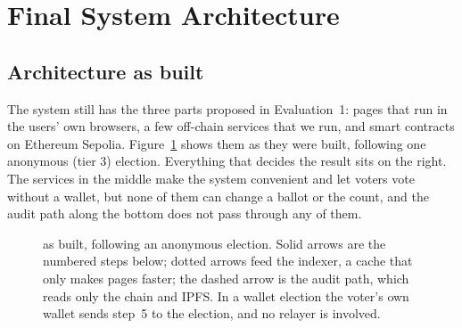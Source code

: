 \section{Final System Architecture}\label{sec:architecture}

\subsection{Architecture as built}

The system still has the three parts proposed in Evaluation~1: pages that run
in the users' own browsers, a few off-chain services that we run, and smart
contracts on Ethereum Sepolia. Figure~\ref{fig:final-architecture} shows them as
they were built, following one anonymous (tier 3) election. Everything that
decides the result sits on the right. The services in the middle make the
system convenient and let voters vote without a wallet, but none of them can
change a ballot or the count, and the audit path along the bottom does not
pass through any of them.

\begin{figure}[htbp]
  \centering
  \resizebox{\textwidth}{!}{}
  \caption{\projectname{} as built, following an anonymous election. Solid
    arrows are the numbered steps below; dotted arrows feed the indexer, a
    cache that only makes pages faster; the dashed arrow is the audit path,
    which reads only the chain and IPFS. In a wallet election the voter's own
    wallet sends step~5 to the election, and no relayer is involved.}
  \label{fig:final-architecture}
\end{figure}

